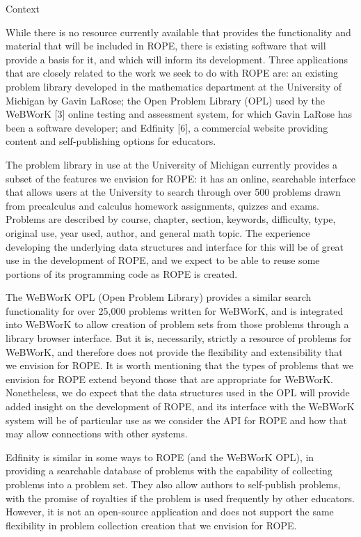 \documentclass[11pt]{article}
\begin{document}
\begin{section}{Context}

While there is no resource currently available that provides the
functionality and material that will be included in ROPE, there is
existing software that will provide a basis for it, and which will inform
its development.  Three applications that are closely related to the work
we seek to do with ROPE are: an existing problem library developed in the
mathematics department at the University of Michigan by Gavin LaRose; the
Open Problem Library (OPL) used by the WeBWorK [3] %
online
testing and assessment system, for which Gavin LaRose has been a software
developer; and Edfinity [6], a commercial website providing content and
self-publishing options for educators.

The problem library in use at the University of Michigan currently
provides a subset of the features we envision for ROPE: it has an
online, searchable interface that allows users at the University to
search through over 500 problems drawn from precalculus and calculus
homework assignments, quizzes and exams.  Problems are described by
course, chapter, section, keywords, difficulty, type, original use, year
used, author, and general math topic.  The experience developing the
underlying data structures and interface for this will be of great use in
the development of ROPE, and we expect to be able to reuse some
portions of its programming code as ROPE is created.  

The WeBWorK OPL (Open Problem Library) provides a similar search
functionality for over 25,000 problems written for WeBWorK, and is
integrated into WeBWorK to allow creation of problem sets from those
problems through a library browser interface.  But it is, necessarily,
strictly a resource of problems for WeBWorK, and therefore does not
provide the flexibility and extensibility that we envision for ROPE.  It
is worth mentioning that the types of problems that we envision for ROPE
extend beyond those that are appropriate for WeBWorK.  Nonetheless, we do
expect that the data structures used in the OPL will provide added insight
on the development of ROPE, and its interface with the WeBWorK system will
be of particular use as we consider the API for ROPE and how that may
allow connections with other systems.

Edfinity is similar in some ways to ROPE (and the WeBWorK OPL), in
providing a searchable database of problems with the capability of 
collecting problems into a problem set.  They also allow authors to 
self-publish problems, with the promise of royalties if the problem is
used frequently by other educators.  However, it is not an open-source
application and does not support the same flexibility in problem
collection creation that we envision for ROPE.


\end{section}
\end{document}
